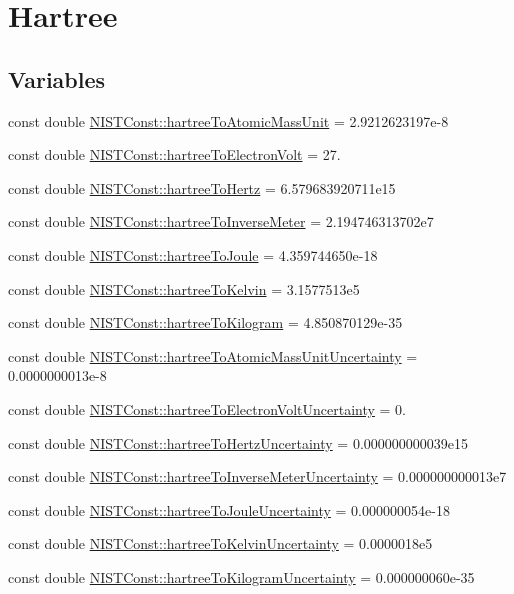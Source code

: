 \hypertarget{group___hartree}{}\section{Hartree}
\label{group___hartree}
\subsection*{Variables}
\begin{DoxyCompactItemize}
\item 
const double \hyperlink{group___hartree_gafc823cd4d405fbad0af7abf03a28917d}{N\+I\+S\+T\+Const\+::hartree\+To\+Atomic\+Mass\+Unit} = 2.\+9212623197e-\/8
\item 
const double \hyperlink{group___hartree_ga225406ee0c3f44db3c49563e7dd253ce}{N\+I\+S\+T\+Const\+::hartree\+To\+Electron\+Volt} = 27.
\item 
const double \hyperlink{group___hartree_gaf2341e65d7aba07555272afe4a14345e}{N\+I\+S\+T\+Const\+::hartree\+To\+Hertz} = 6.\+579683920711e15
\item 
const double \hyperlink{group___hartree_ga98d22d0957c639e03a8432aadd02f58f}{N\+I\+S\+T\+Const\+::hartree\+To\+Inverse\+Meter} = 2.\+194746313702e7
\item 
const double \hyperlink{group___hartree_ga0c47e6885cdf30ceb56ac3c9420cb81c}{N\+I\+S\+T\+Const\+::hartree\+To\+Joule} = 4.\+359744650e-\/18
\item 
const double \hyperlink{group___hartree_ga5468b69d29f43719e4642f9c5248e546}{N\+I\+S\+T\+Const\+::hartree\+To\+Kelvin} = 3.\+1577513e5
\item 
const double \hyperlink{group___hartree_ga1184624f36892653b10c2bb068541f82}{N\+I\+S\+T\+Const\+::hartree\+To\+Kilogram} = 4.\+850870129e-\/35
\item 
const double \hyperlink{group___hartree_ga7be8625774a1b159233ac984e904cdb2}{N\+I\+S\+T\+Const\+::hartree\+To\+Atomic\+Mass\+Unit\+Uncertainty} = 0.\+0000000013e-\/8
\item 
const double \hyperlink{group___hartree_ga8335ddd7939b91f3191fdbed28767947}{N\+I\+S\+T\+Const\+::hartree\+To\+Electron\+Volt\+Uncertainty} = 0.
\item 
const double \hyperlink{group___hartree_ga97442b1c5b8ece399ff3aebb15064a89}{N\+I\+S\+T\+Const\+::hartree\+To\+Hertz\+Uncertainty} = 0.\+000000000039e15
\item 
const double \hyperlink{group___hartree_ga0554c0859210dac9ff459c44c1bd70ca}{N\+I\+S\+T\+Const\+::hartree\+To\+Inverse\+Meter\+Uncertainty} = 0.\+000000000013e7
\item 
const double \hyperlink{group___hartree_ga2e016fc3c1dbb3e68befcfb929034c85}{N\+I\+S\+T\+Const\+::hartree\+To\+Joule\+Uncertainty} = 0.\+000000054e-\/18
\item 
const double \hyperlink{group___hartree_gace6578c3f664e11b0eba73a20efd7f16}{N\+I\+S\+T\+Const\+::hartree\+To\+Kelvin\+Uncertainty} = 0.\+0000018e5
\item 
const double \hyperlink{group___hartree_ga88a5e0e81776199fdc7d4b5a424196a8}{N\+I\+S\+T\+Const\+::hartree\+To\+Kilogram\+Uncertainty} = 0.\+000000060e-\/35
\end{DoxyCompactItemize}


